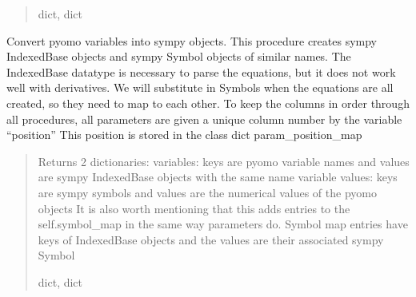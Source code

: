 \documentclass[letterpaper,10pt,english]{sphinxmanual}
\begin{document}
\begin{fulllineitems}
\begin{fulllineitems}
\begin{quote}
\begin{description}
\sphinxAtStartPar
dict, dict

\end{description}\end{quote}

\end{fulllineitems}


\begin{fulllineitems}
\label{\detokenize{src.sensitivity.faster_sensitivity:src.sensitivity.faster_sensitivity.AutoSympy.get_variables}}
\pysigstartsignatures
\pysiglinewithargsret
{}
{}
{}
\pysigstopsignatures
\sphinxAtStartPar
Convert pyomo variables into sympy objects.
This procedure creates sympy IndexedBase objects and sympy Symbol objects of similar names.
The IndexedBase datatype is necessary to parse the equations, but it does not work well with derivatives.
We will substitute in Symbols when the equations are all created, so they need to map to each other.
To keep the columns in order through all procedures, all parameters are given a unique column number by the variable “position”
This position is stored in the class dict param\_position\_map
\begin{quote}\begin{description}
\sphinxAtStartPar
Returns 2 dictionaries:
variables: keys are pyomo variable names and values are sympy IndexedBase objects with the same name
variable values: keys are sympy symbols and values are the numerical values of the pyomo objects
It is also worth mentioning that this adds entries to the self.symbol\_map in the same way parameters do.
Symbol map entries have keys of IndexedBase objects and the values are their associated sympy Symbol

\sphinxAtStartPar
dict, dict

\end{description}\end{quote}

\end{fulllineitems}


\end{fulllineitems}

\end{document}
